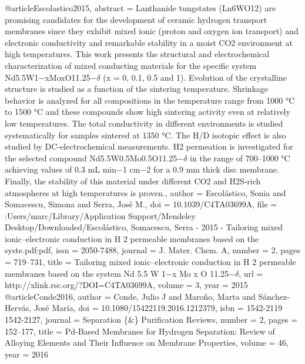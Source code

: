 @article{Escolastico2015,
abstract = {Lanthanide tungstates (Ln6WO12) are promising candidates for the development of ceramic hydrogen transport membranes since they exhibit mixed ionic (proton and oxygen ion transport) and electronic conductivity and remarkable stability in a moist CO2 environment at high temperatures. This work presents the structural and electrochemical characterization of mixed conducting materials for the specific system Nd5.5W1−xMoxO11.25−$\delta$ (x = 0, 0.1, 0.5 and 1). Evolution of the crystalline structure is studied as a function of the sintering temperature. Shrinkage behavior is analyzed for all compositions in the temperature range from 1000 °C to 1500 °C and these compounds show high sintering activity even at relatively low temperatures. The total conductivity in different environments is studied systematically for samples sintered at 1350 °C. The H/D isotopic effect is also studied by DC-electrochemical measurements. H2 permeation is investigated for the selected compound Nd5.5W0.5Mo0.5O11.25−$\delta$ in the range of 700–1000 °C achieving values of 0.3 mL min−1 cm−2 for a 0.9 mm thick disc membrane. Finally, the stability of this material under different CO2 and H2S-rich atmospheres at high temperatures is proven.},
author = {Escol{\'{a}}stico, Sonia and Somacescu, Simona and Serra, Jos{\'{e}} M.},
doi = {10.1039/C4TA03699A},
file = {:Users/marc/Library/Application Support/Mendeley Desktop/Downloaded/Escol{\'{a}}stico, Somacescu, Serra - 2015 - Tailoring mixed ionic–electronic conduction in H 2 permeable membranes based on the syste.pdf:pdf},
issn = {2050-7488},
journal = {J. Mater. Chem. A},
number = {2},
pages = {719--731},
title = {{Tailoring mixed ionic–electronic conduction in H 2 permeable membranes based on the system Nd 5.5 W 1−x Mo x O 11.25−$\delta$}},
url = {http://xlink.rsc.org/?DOI=C4TA03699A},
volume = {3},
year = {2015}
}
@article{Conde2016,
author = {Conde, Julio J and Maro{\~{n}}o, Marta and S{\'{a}}nchez-Herv{\'{a}}s, Jos{\'{e}} Mar{\'{i}}a},
doi = {10.1080/15422119.2016.1212379},
isbn = {1542-2119 1542-2127},
journal = {Separation {\{}{\&}{\}} Purification Reviews},
number = {2},
pages = {152--177},
title = {{Pd-Based Membranes for Hydrogen Separation: Review of Alloying Elements and Their Influence on Membrane Properties}},
volume = {46},
year = {2016}
}
